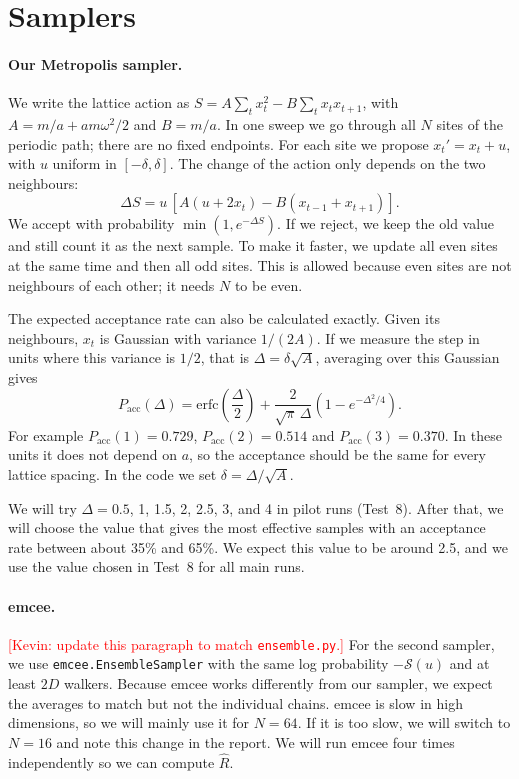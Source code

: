 \documentclass[11pt]{article}
\newcommand{\fillin}[1]{\textcolor{red}{[#1]}}
\begin{document}
\section{Samplers}
\paragraph{Our Metropolis sampler.} We write the lattice action as $S = A\sum_t x_t^2 - B\sum_t x_t x_{t+1}$, with $A = m/a + am\omega^2/2$ and $B = m/a$. In one sweep we go through all $N$ sites of the periodic path; there are no fixed endpoints. For each site we propose $x_t' = x_t + u$, with $u$ uniform in $[-\delta, \delta]$. The change of the action only depends on the two neighbours:
\begin{equation}
  \Delta S = u\,[A(u + 2x_t) - B(x_{t-1}+x_{t+1})].
  \label{eq:dS}
\end{equation}
We accept with probability $\min(1, e^{-\Delta S})$. If we reject, we keep the old value and still count it as the next sample. To make it faster, we update all even sites at the same time and then all odd sites. This is allowed because even sites are not neighbours of each other; it needs $N$ to be even.

The expected acceptance rate can also be calculated exactly. Given its neighbours, $x_t$ is Gaussian with variance $1/(2A)$. If we measure the step in units where this variance is $1/2$, that is $\Delta = \delta\sqrt{A}$, averaging over this Gaussian gives
\begin{equation}
  P_{\text{acc}}(\Delta) = \mathrm{erfc}\!\left(\frac\Delta 2\right) + \frac{2}{\sqrt\pi\,\Delta}\left(1 - e^{-\Delta^2/4}\right).
  \label{eq:acc}
\end{equation}
For example $P_{\text{acc}}(1) = 0.729$, $P_{\text{acc}}(2) = 0.514$ and $P_{\text{acc}}(3) = 0.370$. In these units it does not depend on $a$, so the acceptance should be the same for every lattice spacing. In the code we set $\delta = \Delta/\sqrt{A}$.

We will try $\Delta = 0.5$, 1, 1.5, 2, 2.5, 3, and 4 in pilot runs (Test~8). After that, we will choose the value that gives the most effective samples with an acceptance rate between about 35\% and 65\%. We expect this value to be around 2.5, and we use the value chosen in Test~8 for all main runs.

\paragraph{emcee.} \fillin{Kevin: update this paragraph to match \texttt{ensemble.py}.} For the second sampler, we use \texttt{emcee.EnsembleSampler} with the same log probability $-\mathcal S(u)$ and at least $2D$ walkers. Because emcee works differently from our sampler, we expect the averages to match but not the individual chains. emcee is slow in high dimensions, so we will mainly use it for $N = 64$. If it is too slow, we will switch to $N = 16$ and note this change in the report. We will run emcee four times independently so we can compute $\hat R$.
\end{document}
